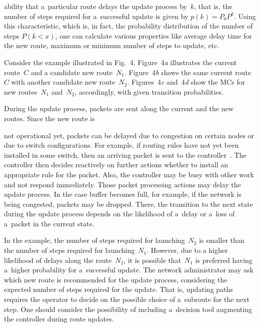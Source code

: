 \begin{multicols}{2}
\noindent
ability that a~particular route delays the update process 
by~$k$, that is, the number of steps required for a~successful update is given by 
$p(k)=P_0 P^k$. Using this characteristic, which is, in fact, the 
probability distribution of the number of steps $P(k < x)$, one can 
calculate various properties like average delay time for the new route, 
maximum or minimum number of steps to update, etc.
 
 Consider the example illustrated in Fig.~4. 
Figure~4\textit{a} illustrates the current route~$C$ and a candidate new route~$N_1$. 
Figure~4\textit{b} shows the same current route~$C$ with another candidate 
new route~$N_2$. 
Figures~4\textit{c} and~4\textit{d} 
show the MCs for new routes~$N_1$ and~$N_2$, accordingly, with given transition 
probabilities.

During the update process, packets are sent along the current and the new routes. 
Since the new route is\linebreak\vspace*{-9.5pt}

\columnbreak

\noindent
 not operational yet, packets can be delayed due to 
congestion on certain nodes or due to switch configurations. 
%
For example, if routing rules have not yet been installed in some switch, then an 
arriving packet is sent to the controller~\cite{onf_openflow_2015}. The controller 
then decides reactively on further actions whether to install an appropriate rule 
for the packet. Also, the controller may be busy with other work and not respond 
immediately. Those packet processing actions may delay the update process. 
In the case buffer becomes full, for example, if the network is being congested, 
packets may be dropped. There, the transition to the next state during the 
update process depends on the likelihood of a~delay or a~loss of a~packet in the 
current state. 

In the example, the number of steps required for launching~$N_2$ is smaller than 
the number of steps required for launching~$N_1$. However, due to a higher likelihood 
of delays along the route~$N_2$, it is possible that~$N_1$ is preferred having 
a~higher probability for a~successful update. The network administrator may ask 
which new route is recommended for the update process, considering the expected 
number of steps required for the update. 
%
That is, updating paths requires the operator to decide 
on the possible choice of a~subroute for the next step. 
One should consider the possibility of including a~decision tool augmenting the 
controller during route updates. 


\end{multicols}
